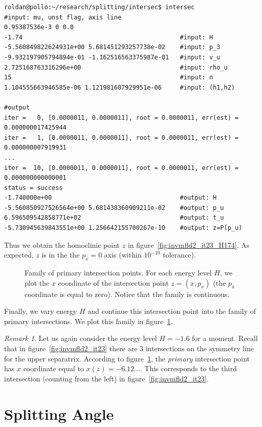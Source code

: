 \documentclass[a4paper]{amsart}
\theoremstyle{remark}
\newtheorem{rem}[thm]{Remark}
\begin{document}
\begin{verbatim}
roldan@pollo:~/research/splitting/intersec$ intersec
#input: mu, unst flag, axis line
0.95387536e-3 0 0.0
-1.74                                           #input: H
-5.560849822624931e+00 5.681451293257738e-02    #input: p_3
-9.932197905794894e-01 -1.162516563375987e-01   #input: v_u
2.725168763316296e+00                           #input: rho_u
15                                              #input: n
1.104555663946585e-06 1.121981607929951e-06     #input: (h1,h2)

#output
iter =   0, [0.0000011, 0.0000011], root = 0.0000011, err(est) = 0.000000017425944
iter =   1, [0.0000011, 0.0000011], root = 0.0000011, err(est) = 0.000000007919931
...
iter =  10, [0.0000011, 0.0000011], root = 0.0000011, err(est) = 0.000000000000001
status = success
-1.740000e+00                                   #output: H
-5.560850927526564e+00 5.681438360909211e-02    #output: p_u
6.596509542858771e+02                           #output: t_u
-5.730945639843551e+00 1.256642155700267e-10    #output: z=P(p_u)
\end{verbatim}
Thus we obtain the homoclinic point $z$ in
figure~\ref{fig:invmfld2_it23_H174}.  As expected, $z$ is in the the
$p_x=0$ axis (within $10^{-10}$ tolerance).

\begin{figure}
\caption{Family of primary intersection points. For each energy level
$H$, we plot the $x$ coordinate of the intersection point $z=(x,p_x)$
(the $p_x$ coordinate is equal to zero). Notice that the family is
continuous.}
\label{fig:intersec}
\end{figure}

Finally, we vary energy $H$ and continue this intersection point into
the family of primary intersections. We plot this family in
figure~\ref{fig:intersec}.

\begin{rem}
Let us again consider the energy level $H=-1.6$ for a moment. 
Recall that in figure~\ref{fig:invmfld2_it23} there are $3$
intersections on the symmetry line for the upper separatrix.
According to figure~\ref{fig:intersec}, the \emph{primary}
intersection point has $x$ coordinate equal to $x(z)=-6.12\dots$. 
This corresponds to the third intersection (counting from the left) in
figure~\ref{fig:invmfld2_it23}.
\end{rem}

\section{Splitting Angle} \label{sec:splitting_angle}
\end{document}
